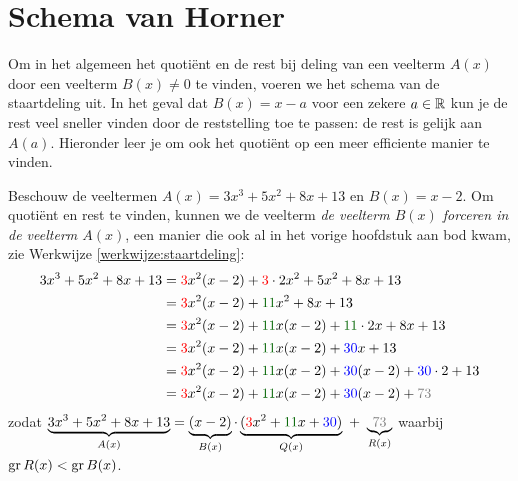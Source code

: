 \documentclass{ximera}
\begin{document}
\section{Schema van Horner}

Om in het algemeen het quoti\"ent en de rest bij deling van een veelterm $A(x)$ door een veelterm $B(x) \neq 0$ te vinden, voeren we het schema van de staartdeling uit. In het geval dat $B(x) = x-a$ voor een zekere $a \in \mathbb{R}$ kun je de rest veel sneller vinden door de reststelling toe te passen: de rest is gelijk aan $A(a)$. Hieronder leer je om ook het quoti\"ent op een meer efficiente manier te vinden. 

\begin{algorithm} 
Beschouw de veeltermen $A(x) = 3x^3+5x^2+8x+13$ en $B(x) = x-2$. Om quoti\"ent en rest te vinden, kunnen we de veelterm 
{\em de veelterm $B(x)$ forceren in de veelterm $A(x)$}, een manier die ook al in het vorige hoofdstuk aan bod kwam, zie Werkwijze \ref{werkwijze:staartdeling}:
\begin{align*}
3x^3+5x^2+8x+13
& = {\mathcolor{red}{3}}x^2(x-2) + {\mathcolor{red}{3}}\cdot 2x^2 + 5x^2 + 8x + 13 \\
& = {\mathcolor{red}{3}}x^2(x-2) + {\mathcolor{graf}{11}}x^2 + 8x + 13 \\
& = {\mathcolor{red}{3}}x^2(x-2) + {\mathcolor{graf}{11}}x(x-2) + {\mathcolor{graf}{11}}\cdot 2x + 8x + 13 \\
& = {\mathcolor{red}{3}}x^2(x-2) + {\mathcolor{graf}{11}}x(x-2) + {\mathcolor{blue}{30}}x + 13 \\
& = {\mathcolor{red}{3}}x^2(x-2) + {\mathcolor{graf}{11}}x(x-2) + {\mathcolor{blue}{30}}(x-2) + {\mathcolor{blue}{30}} \cdot 2 + 13 \\
& = {\mathcolor{red}{3}}x^2(x-2) + {\mathcolor{graf}{11}}x(x-2) + {\mathcolor{blue}{30}}(x-2) + {\mathcolor{gray}{73}} %
\end{align*}
zodat $\D \underbrace{3x^3+5x^2+8x+13}_{A(x)} = \underbrace{(x-2)}_{B(x)}\cdot\underbrace{({\mathcolor{red}{3}}x^2 + {\mathcolor{graf}{11}}x + {\mathcolor{blue}{30}})}_{Q(x)} \,\, + \,\, \underbrace{{\mathcolor{gray}{73}}}_{R(x)}$ waarbij $\operatorname{gr} R(x) < \operatorname{gr} B(x)$.


\end{algorithm}
\end{document}
